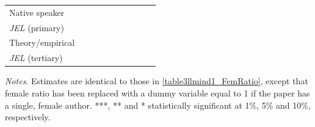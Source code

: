 \begin{table}
\begin{threeparttable}
\begin{tabular}{p{4.5cm}S@{}S@{}S@{}S@{}S@{}S@{}S@{}S@{}S@{}}
            Native speaker                &               &               &               &               &           {}   &           {}   &           {}   &           {}   &           {}   \\
            \textit{JEL} (primary)        &               &               &               &               &               &               &           {}   &               &               \\
            Theory/empirical              &               &               &               &               &               &               &               &           {}   &               \\
            \textit{JEL} (tertiary)       &               &               &               &               &               &               &               &               &           {}   \\
            \bottomrule
        \end{tabular}
        \begin{tablenotes}
            \tiny
            \item \textit{Notes}. Estimates are identical to those in \autoref{table3llmind1_FemRatio}, except that female ratio has been replaced with a dummy variable equal to 1 if the paper has a single, female author. ***, ** and * statistically significant at 1\%, 5\% and 10\%, respectively.
        \end{tablenotes}
    \end{threeparttable}

\end{table}
